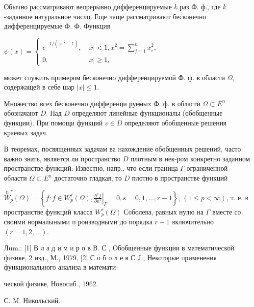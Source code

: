 \documentclass[10pt]{article}
\begin{document}
Обычно рассматривают вепрерывно дифференцируемые $k$ раз Ф. ф., где $k$-заданное натуральное число. Еще чаще рассматривают бесконечно дифференцируемые Ф. Ф. Функция



$\psi(x)= \begin{cases}e^{-1 /\left(|x|^{2}-1\right)}, & |x|<1, x^{2}=\sum_{j=1}^{n} x_{i}^{2}, \\ 0, & |x| \geqslant 1,\end{cases}$



может служить примером бесконечно дифференцируемой Ф. ф. в области $\Omega$, содержащей в себе шар $|x| \leqslant 1$.



Множество всех бесконечно дифференци руемых Ф. ф. в области $\Omega \subset E^{n}$ обозначают $D$. Над $D$ определяют линейные функционалы (обобщенные функции). При помощи функций $v \in D$ определяют обобщенные решения краевых задач.



В теоремах, посвященных задачам ва нахождение обобщенных решений, часто важно знать, является ли пространство $D$ плотным в нек-ром конкретно заданном пространстве функций. Известно, напр., что если граница $\Gamma$ ограниченной области $\Omega \subset E^{n}$ достаточно гладкая, то $D$ плотно в пространстве функций



$\stackrel{0}{W}_{p}^{r}(\Omega)=\left\{f: f \in W_{p}^{r}(\Omega),\left.\frac{\partial^{s} f}{\partial n^{s}}\right|_{\Gamma}=0, s=0,1, \ldots, r-1\right\}$, $(1 \leqslant p<\infty)$, т. е. в пространстве функций класса $W_{p}^{r}(\Omega)$ Соболева, равных нулю на $\Gamma$ вместе со своими нормалыными п роизводными до порядка $r-1$ включительно $(r=1,2, \ldots)$.



Лum.: [1] В л а д и м и р о в В. С , Обобщенные функции в математической физике, 2 изд., М., 1979, [2] С о б о л е в С J., Некоторые применения функционального анализа в математи-

ческой физике, Новосиб., 1962.

С. M. Никольский.
\end{document}
